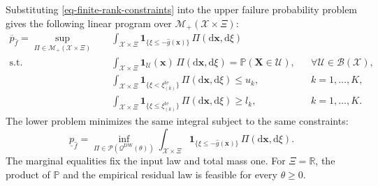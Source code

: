 \documentclass[review,11pt,3p,authoryear,nopreprintline]{elsarticle}
\begin{document}
Substituting \eqref{eq-finite-rank-constraints} into the upper failure probability problem gives the following linear program over $\mathcal M_+(\mathcal X\times\Xi)$:
\begin{equation}
  \begin{aligned}
    \overline p_{\hat f}
    =\sup_{\Pi\in\mathcal M_+(\mathcal X\times\Xi)}\quad&
      \int_{\mathcal X\times\Xi}
      \mathbf1_{\{\xi\le -\hat g(\bm x)\}}\,\Pi(\mathrm d\bm x,\mathrm d\xi)\\
    \text{s.t.}\quad&
      \int_{\mathcal X\times\Xi}
      \mathbf1_{\mathcal U}(\bm x)\,\Pi(\mathrm d\bm x,\mathrm d\xi)
      =\mathbb P(\bm X\in\mathcal U),
      &&\forall \mathcal U\in\mathcal B(\mathcal X),\\
    &\int_{\mathcal X\times\Xi}
      \mathbf1_{\{\xi<\xi_{(k)}^{\mathrm{te}}\}}\,\Pi(\mathrm d\bm x,\mathrm d\xi)\le u_k,
      &&k=1,\ldots,K,\\
    &\int_{\mathcal X\times\Xi}
      \mathbf1_{\{\xi\le \xi_{(k)}^{\mathrm{te}}\}}\,\Pi(\mathrm d\bm x,\mathrm d\xi)\ge l_k,
      &&k=1,\ldots,K.
  \end{aligned}
  \label{eq-measure-upper}
\end{equation}
The lower problem minimizes the same integral subject to the same constraints:
\begin{equation*}
  \underline p_{\hat f}
  =\inf_{\Pi\in\mathcal P(\mathcal Q^{\mathrm{DW}}(\theta))}
    \int_{\mathcal X\times\Xi}
    \mathbf1_{\{\xi\le -\hat g(\bm x)\}}\,\Pi(\mathrm d\bm x,\mathrm d\xi).
\end{equation*}
The marginal equalities fix the input law and total mass one. For $\Xi=\mathbb R$, the product of $\mathbb P$ and the empirical residual law is feasible for every $\theta\ge0$.
\end{document}
